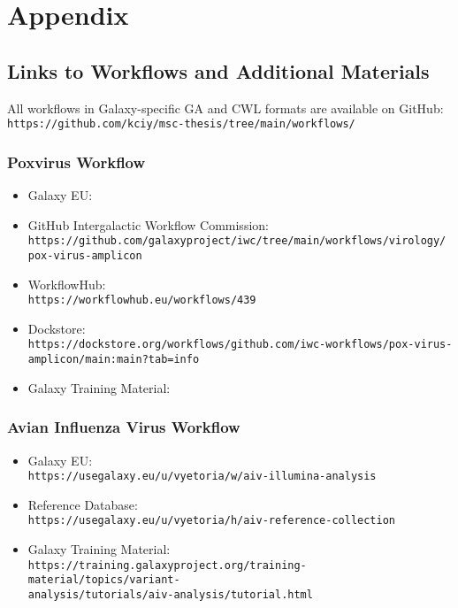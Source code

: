 \chapter*{Appendix}\label{chap:appendix}

\section*{\thesection \quad Links to Workflows and Additional Materials}
\hspace*{-18pt}All workflows in Galaxy-specific GA and CWL formats are available on GitHub:\\
\texttt{https://github.com/kciy/msc-thesis/tree/main/workflows/}

\subsection*{\thesubsection \quad Poxvirus Workflow}\label{sec:apx-pox-links}
\begin{itemize}
	\setlength{\itemsep}{-0.4cm}
	\item Galaxy EU: \todoit
	\item GitHub Intergalactic Workflow Commission:\\
	\texttt{https://github.com/galaxyproject/iwc/tree/main/workflows/virology/\\pox-virus-amplicon}
	\item WorkflowHub:\\
	\texttt{https://workflowhub.eu/workflows/439}
	\item Dockstore:\\
	\texttt{https://dockstore.org/workflows/github.com/iwc-workflows/pox-virus-\\amplicon/main:main?tab=info}
	\item Galaxy Training Material: \todoit
\end{itemize}

\subsection*{\thesubsection \quad Avian Influenza Virus Workflow}\label{sec:apx-aiv-links}

\begin{itemize}
	\setlength{\itemsep}{-0.4cm}
	\item Galaxy EU:\\
	\texttt{https://usegalaxy.eu/u/vyetoria/w/aiv-illumina-analysis}
	\item Reference Database:\\
	\texttt{https://usegalaxy.eu/u/vyetoria/h/aiv-reference-collection}
	\item Galaxy Training Material:\\
	\texttt{https://training.galaxyproject.org/training-material/topics/variant-\\analysis/tutorials/aiv-analysis/tutorial.html}
\end{itemize}

